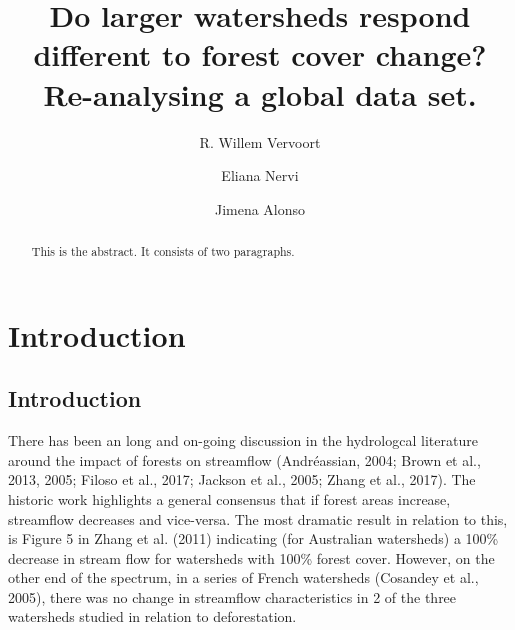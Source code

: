 \documentclass[]{elsarticle} %
\begin{document}
\begin{frontmatter}

  \title{Do larger watersheds respond different to forest cover change?
Re-analysing a global data set.}
    \author[The University of Sydney, INIA]{R. Willem Vervoort}
    \author[INIA]{Eliana Nervi}
    \author[IMFIA]{Jimena Alonso}
      \address[The University of Sydney]{School of Life and Environmental Sciences, The University of Sydney,
Sydney, NSW 2006, Australia}
    \address[INIA]{INIA, Uruguay}
    \address[IMFIA]{Institute of Fluid Mechanics and Environmental Engineering, School of
Engineering, Universidad de la República, 11200 Montevideo, Departamento
de Montevideo, Uruguay}
  
  \begin{abstract}
  This is the abstract. It consists of two paragraphs.
  \end{abstract}
  
 \end{frontmatter}

\hypertarget{introduction}{%
\section{Introduction}\label{introduction}}

\hypertarget{introduction-1}{%
\subsection{Introduction}\label{introduction-1}}

There has been an long and on-going discussion in the hydrologcal
literature around the impact of forests on streamflow (Andréassian,
2004; Brown et al., 2013, 2005; Filoso et al., 2017; Jackson et al.,
2005; Zhang et al., 2017). The historic work highlights a general
consensus that if forest areas increase, streamflow decreases and
vice-versa. The most dramatic result in relation to this, is Figure 5 in
Zhang et al. (2011) indicating (for Australian watersheds) a 100\%
decrease in stream flow for watersheds with 100\% forest cover. However,
on the other end of the spectrum, in a series of French watersheds
(Cosandey et al., 2005), there was no change in streamflow
characteristics in 2 of the three watersheds studied in relation to
deforestation.
\end{document}
